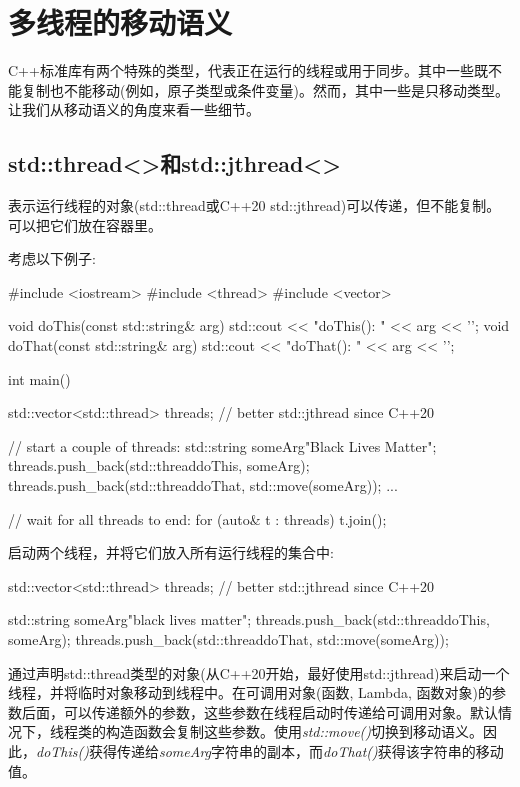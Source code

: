 \section{多线程的移动语义}
C++标准库有两个特殊的类型，代表正在运行的线程或用于同步。其中一些既不能复制也不能移动(例如，原子类型或条件变量)。然而，其中一些是只移动类型。让我们从移动语义的角度来看一些细节。

\subsection{std::thread<>和std::jthread<>}

表示运行线程的对象(std::thread或C++20 std::jthread)可以传递，但不能复制。可以把它们放在容器里。

考虑以下例子:

\begin{cppcode}
#include <iostream>
#include <thread>
#include <vector>

void doThis(const std::string& arg) {
	std::cout << "doThis(): " << arg << '\n';
}
void doThat(const std::string& arg) {
	std::cout << "doThat(): " << arg << '\n';
}

int main()
{
	std::vector<std::thread> threads; // better std::jthread since C++20
	
	// start a couple of threads:
	std::string someArg{"Black Lives Matter"};
	threads.push_back(std::thread{doThis, someArg});
	threads.push_back(std::thread{doThat, std::move(someArg)});
	...
	
	// wait for all threads to end:
	for (auto& t : threads) {
		t.join();
	}
}
\end{cppcode}

启动两个线程，并将它们放入所有运行线程的集合中:

\begin{cppcode}
std::vector<std::thread> threads; // better std::jthread since C++20

std::string someArg{"black lives matter"};
threads.push_back(std::thread{doThis, someArg});
threads.push_back(std::thread{doThat, std::move(someArg)});
\end{cppcode}

通过声明std::thread类型的对象(从C++20开始，最好使用std::jthread)来启动一个线程，并将临时对象移动到线程中。在可调用对象(函数, Lambda, 函数对象)的参数后面，可以传递额外的参数，这些参数在线程启动时传递给可调用对象。默认情况下，线程类的构造函数会复制这些参数。使用\textit{std::move()}切换到移动语义。因此，\textit{doThis()}获得传递给\textit{someArg}字符串的副本，而\textit{doThat()}获得该字符串的移动值。

